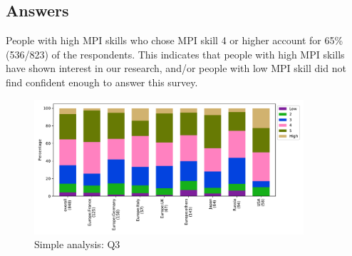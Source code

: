 
\subsection{Answers}


People with high MPI skills who chose MPI skill 4 or higher 
account for 65\% (536/823) of the respondents. This 
indicates that people with high MPI skills have shown 
interest in our research, and/or people with low MPI skill did not find
confident enough to answer this survey. 
\begin{figure}[htb]
\begin{center}
\includegraphics[width=10cm]{../pdfs/Q3.pdf}
\caption{Simple analysis: Q3}
\label{fig:Q3}
\end{center}
\end{figure}

